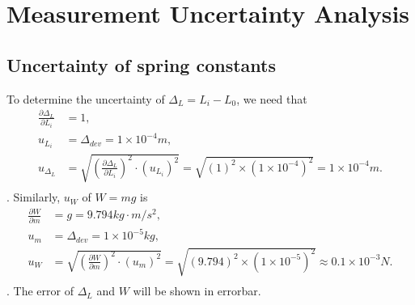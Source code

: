 \section{Measurement Uncertainty Analysis}
\subsection{Uncertainty of spring constants}
    To determine the uncertainty of $\Delta_L=L_i-L_0$, we need that
    \[
    \begin{split}
        \frac{\partial \Delta_L}{\partial L_i}&=1,\\
        u_{L_i}&=\Delta_{dev}=1\times10^{-4}m,\\
        u_{\Delta_L}&=\sqrt{(\frac{\partial \Delta_L}{\partial L_i})^2\cdot (u_{L_i})^2}=\sqrt{(1)^2\times (1\times10^{-4})^2}=1\times10^{-4}m.\\
    \end{split}
    \].
    Similarly, $u_{W}$ of $W=mg$ is
    \[
    \begin{split}
        \frac{\partial W}{\partial m}&=g=9.794kg\cdot m/s^2,\\
        u_m&=\Delta_{dev}=1\times10^{-5}kg,\\
        u_{W}&=\sqrt{(\frac{\partial W}{\partial m})^2\cdot (u_m)^2}=\sqrt{(9.794)^2\times (1\times10^{-5})^2}\approx 0.1\times10^{-3}N.\\
    \end{split}
    \].
    The error of $\Delta_L$ and $W$ will be shown in errorbar.
